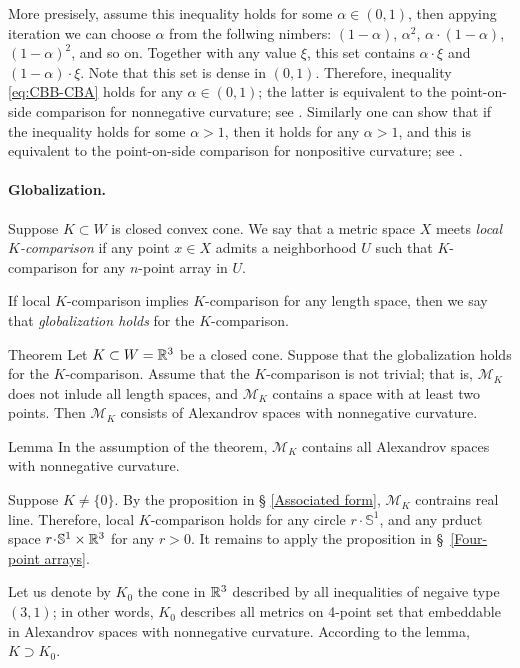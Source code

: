 \documentclass[a4paper,10pt]{article}
\begin{document}
More presisely, assume this inequality holds for some $\alpha\in (0,1)$, then appying iteration we can choose $\alpha$ from the follwing nimbers: $(1-\alpha)$, $\alpha^2$,  $\alpha\cdot (1-\alpha)$, $(1-\alpha)^2$, and so on.
Together with any value $\xi$, this set contains $\alpha\cdot \xi$ and $(1-\alpha)\cdot\xi$.
Note that this set is dense in $(0,1)$.
Therefore, inequality \ref{eq:CBB-CBA} holds for any $\alpha\in (0,1)$; the latter is equivalent to the point-on-side comparison for nonnegative curvature; see \cite[8.14]{AKP-2024}.
Similarly one can show that if the inequality holds for some $\alpha>1$, then it holds for any $\alpha>1$,
and this is equivalent to the point-on-side comparison for nonpositive curvature; see \cite[9.14]{AKP-2024}.
\qeds


\paragraph{Globalization.}\label{par:globalization}
Suppose $K\subset W$ is closed convex cone.
We say that a metric space $X$ meets \emph{local $K$-comparison} if any point $x\in X$ admits a neighborhood $U$ such that $K$-comparison for any $n$-point array in $U$.

If local $K$-comparison implies $K$-comparison for any length space, then we say that \emph{globalization holds} for the $K$-comparison.

\begin{thm}{Theorem}
Let $K\subset W=\mathbb{R}^3$ be a closed cone.
Suppose that the globalization holds for the $K$-comparison.
Assume that the $K$-comparison is not trivial; that is, $\mathcal{M}_K$ does not inlude all length spaces,
and $\mathcal{M}_K$ contains a space with at least two points.
Then $\mathcal{M}_K$ consists of Alexandrov spaces with nonnegative curvature.
\end{thm}

\begin{thm}{Lemma}
In the assumption of the theorem, $\mathcal{M}_K$ contains all Alexandrov spaces with nonnegative curvature.
\end{thm}

Suppose $K\ne\{0\}$.
By the proposition in § \ref{Associated form}, $\mathcal{M}_K$ contrains real line.
Therefore, local $K$-comparison holds for any circle $r\cdot \mathbb{S}^1$, and any prduct space $r\cdot \mathbb{S}^1\times\RR^3$ for any $r>0$.
It remains to apply the proposition in §~\ref{Four-point arrays}.
\qeds

Let us denote by $K_0$ the cone in $\mathbb{R}^3$ described by all inequalities of negaive type $(3,1)$;
in other words, $K_0$ describes all metrics on 4-point set that embeddable in Alexandrov spaces with nonnegative curvature.
According to the lemma, $K\supset K_0$.
\end{document}
